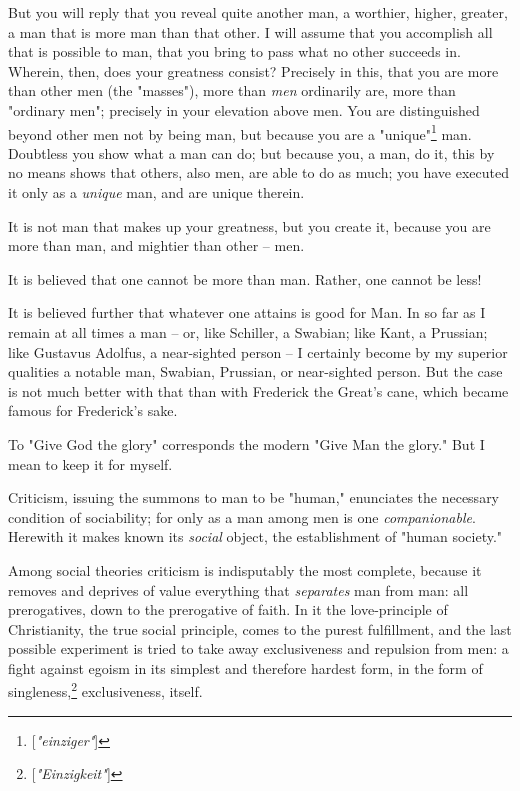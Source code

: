 \documentclass[a4paper]{book}
\begin{document}
But you will reply that you reveal quite another man, a worthier, higher, 
greater, a man that is more man than that other. I will assume that you 
accomplish all that is possible to man, that you bring to pass what no other 
succeeds in. Wherein, then, does your greatness consist? Precisely in this, 
that you are more than other men (the "{}masses"{}), more than \textit{men} 
ordinarily are, more than "{}ordinary men"{}; precisely in your elevation 
above men. You are distinguished beyond other men not by being man, but 
because you are a "{}unique"{}\footnote{[\textit{"{}einziger"{}}]} man. 
Doubtless you show what a man can do; but because you, a man, do it, this by 
no means shows that others, also men, are able to do as much; you have 
executed it only as a \textit{unique} man, and are unique therein.

It is not man that makes up your greatness, but you create it, because you are 
more than man, and mightier than other -- men.

It is believed that one cannot be more than man. Rather, one cannot be less!

It is believed further that whatever one attains is good for Man. In so far as 
I remain at all times a man -- or, like Schiller, a Swabian; like Kant, a 
Prussian; like Gustavus Adolfus, a near-sighted person -- I certainly become 
by my superior qualities a notable man, Swabian, Prussian, or near-sighted 
person. But the case is not much better with that than with Frederick the 
Great's cane, which became famous for Frederick's sake.

To "{}Give God the glory"{} corresponds the modern "{}Give Man the glory."{} 
But I mean to keep it for myself.

Criticism, issuing the summons to man to be "{}human,"{} enunciates the 
necessary condition of sociability; for only as a man among men is one 
\textit{companionable}. Herewith it makes known its \textit{social} object, 
the establishment of "{}human society."{}

Among social theories criticism is indisputably the most complete, because it 
removes and deprives of value everything that \textit{separates} man from man: 
all prerogatives, down to the prerogative of faith. In it the love-principle 
of Christianity, the true social principle, comes to the purest fulfillment, 
and the last possible experiment is tried to take away exclusiveness and 
repulsion from men: a fight against egoism in its simplest and therefore 
hardest form, in the form of singleness,\footnote{[\textit{"{}Einzigkeit"{}}]} 
exclusiveness, itself.
\end{document}
